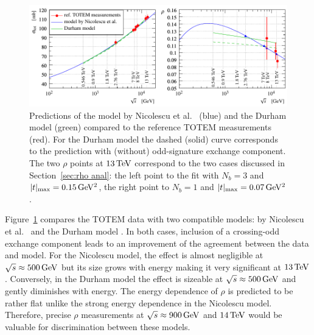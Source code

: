 \begin{figure}
\vskip-5mm
\begin{center}
\includegraphics{fig/matching_models_si_tot_rho.pdf}
\caption{%
Predictions of the model by Nicolescu et al.~\cite{nicolescu-2017} (blue) and the Durham model \cite{durham-2017-note} (green) compared to the reference TOTEM measurements (red). For the Durham model the dashed (solid) curve corresponds to the prediction with (without) odd-signature exchange component. The two $\rho$ points at $13\,{\rm TeV}$ correspond to the two cases discussed in Section~\ref{sec:rho anal}: the left point to the fit with $N_b=3$ and $|t|_{\rm max} = 0.15\,{\rm GeV^2}$, the right point to $N_b=1$ and $|t|_{\rm max} = 0.07\,{\rm GeV^2}$.
}
\label{fig:match models}
\end{center}
\end{figure}

Figure~\ref{fig:match models} compares the TOTEM data with two compatible models: by Nicolescu et al.~\cite{nicolescu-2017} and the Durham model \cite{durham-2017-note}. In both cases, inclusion of a crossing-odd exchange component leads to an improvement of the agreement between the data and model. For the Nicolescu model, the effect is almost negligible at $\sqrt s \approx 500\,{\rm GeV}$ but its size grows with energy making it very significant at $13\,{\rm TeV}$. Conversely, in the Durham model the effect is sizeable at $\sqrt s \approx 500\,{\rm GeV}$ and gently diminishes with energy. The energy dependence of $\rho$ is predicted to be rather flat unlike the strong energy dependence in the Nicolescu model. Therefore, precise $\rho$ measurements at $\sqrt s \approx 900\,{\rm GeV}$ and $14\,{\rm TeV}$ would be valuable for discrimination between these models.
